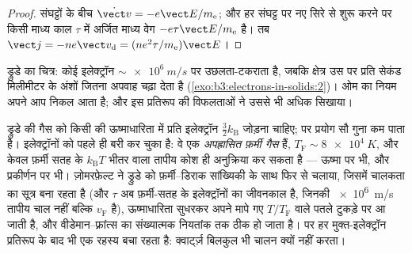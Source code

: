 \begin{proof}
संघट्टों के बीच $\dot{\vect v} = -e\vect E/m_{\text{e}}$;
और हर संघट्ट पर नए सिरे से शुरू करने पर किसी माध्य काल
$\tau$ में अर्जित माध्य वेग $-e\tau\vect E/m_{\text{e}}$ है। तब $\vect j =
-ne\vect v_{\text{d}} = (ne^2\tau/m_{\text{e}})\vect E$।
\end{proof}

\begin{omfigure}

{\small ड्रुडे का चित्र: कोई इलेक्ट्रॉन
$\sim\qty{e6}{m/s}$ पर उछलता-टकराता है, जबकि क्षेत्र उस पर प्रति
सेकंड मिलीमीटर के अंशों जितना अपवाह चढ़ा देता है
(\cref{exo:b3:electrons-in-solids:2})। ओम का नियम अपने आप निकल आता
है; और इस प्रतिरूप की विफलताओं ने उससे भी अधिक सिखाया।}
\end{omfigure}

\begin{remark}[ज़ोमरफ़ेल्ट का बचाव]\label{rem:b3:electrons-in-solids:sommerfeld}
ड्रुडे की गैस को किसी  की ऊष्माधारिता में प्रति इलेक्ट्रॉन
$\tfrac32k_{\text{B}}$ जोड़ना चाहिए; पर प्रयोग सौ गुना कम पाता है।
 इलेक्ट्रॉनों को पहले ही बरी कर चुका
है: वे एक \emph{अपह्रासित फ़र्मी गैस} हैं, $T_{\text{F}} \sim
\qty{8e4}{K}$, और केवल फ़र्मी सतह के
$k_{\text{B}}T$ भीतर वाला तापीय कोश ही अनुक्रिया कर सकता है --- ऊष्मा
पर भी, और प्रकीर्णन पर भी। ज़ोमरफ़ेल्ट ने ड्रुडे को फ़र्मी--डिराक
सांख्यिकी के साथ फिर से चलाया, जिसमें चालकता का सूत्र बना रहता है (और
$\tau$ अब फ़र्मी-सतह के इलेक्ट्रॉनों का जीवनकाल है, जिनकी
\qty{e6}{m/s} तापीय चाल नहीं बल्कि
$v_{\text{F}}$ है), ऊष्माधारिता सुधरकर अपने मापे गए
$T/T_{\text{F}}$ वाले पतले टुकड़े पर आ जाती है, और
वीडेमान--फ़्रांत्स का संख्यात्मक नियतांक तक ठीक हो जाता है। पर हर
मुक्त-इलेक्ट्रॉन प्रतिरूप के बाद भी एक रहस्य बचा रहता है: क्वार्ट्ज़
बिलकुल भी चालन क्यों नहीं करता।
\end{remark}

